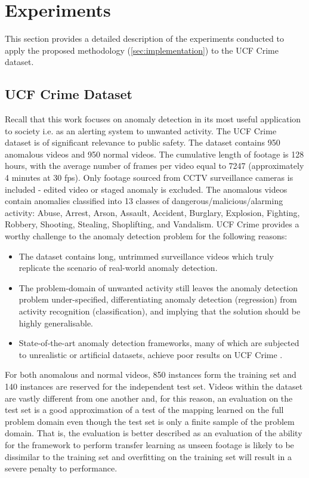 \documentclass[sigplan,authorversion,nonacm, 9pt]{acmart}
\begin{document}
\section{Experiments}\label{sec:empirical}
This section provides a detailed description of the experiments conducted to apply the proposed methodology (\ref{sec:implementation}) to the UCF Crime dataset. 


\subsection{UCF Crime Dataset} 
Recall that this work focuses on anomaly detection in its most useful application to society i.e. as an alerting system to unwanted activity. 
The UCF Crime dataset \cite{dataset} is of significant relevance to public safety.
The dataset contains 950 anomalous videos and 950 normal videos. The cumulative length of footage is 128 hours, with the average number of frames per video equal to 7247 (approximately 4 minutes at 30 fps). Only footage sourced from CCTV surveillance cameras is included - edited video or staged anomaly is excluded. The anomalous videos contain anomalies classified into 13 classes of dangerous/malicious/alarming activity: Abuse, Arrest, Arson, Assault, Accident, Burglary, Explosion, Fighting, Robbery, Shooting, Stealing, Shoplifting, and Vandalism.
UCF Crime provides a worthy challenge to the anomaly detection problem for the following reasons:
\begin{itemize}
    \item The dataset contains long, untrimmed surveillance videos which truly replicate the scenario of real-world anomaly detection.
    \item The problem-domain of unwanted activity still leaves the anomaly detection problem under-specified, differentiating anomaly detection (regression) from activity recognition (classification), and implying that the solution should be highly generalisable.
    \item State-of-the-art anomaly detection frameworks, many of which are subjected to unrealistic or artificial datasets, achieve poor results on UCF Crime \cite{lu} \cite{hassan}.
\end{itemize}
 For both anomalous and normal videos, 850 instances form the training set and 140 instances are reserved for the independent test set. Videos within the dataset are vastly different from one another and, for this reason, an evaluation on the test set is a good approximation of a test of the mapping learned on the full problem domain even though the test set is only a finite sample of the problem domain. That is, the evaluation is better described as an evaluation of the ability for the framework to perform transfer learning as unseen footage is likely to be dissimilar to the training set and overfitting on the training set will result in a severe penalty to performance. 
\end{document}
